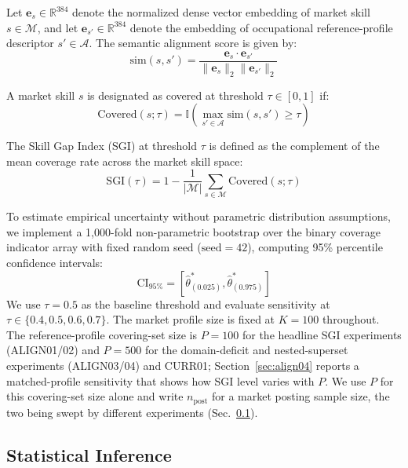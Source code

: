 \documentclass[journal]{IEEEtran}
\begin{document}
Let $\mathbf{e}_s \in \mathbb{R}^{384}$ denote the normalized dense vector embedding of market skill $s \in \mathcal{M}$, and let $\mathbf{e}_{s'} \in \mathbb{R}^{384}$ denote the embedding of occupational reference-profile descriptor $s' \in \mathcal{A}$. The semantic alignment score is given by:
\begin{equation}
\text{sim}(s, s') = \frac{\mathbf{e}_s \cdot \mathbf{e}_{s'}}{\|\mathbf{e}_s\|_2 \|\mathbf{e}_{s'}\|_2}
\label{eq:cosine}
\end{equation}

A market skill $s$ is designated as covered at threshold $\tau \in [0, 1]$ if:
\begin{equation}
\text{Covered}(s; \tau) = \mathbb{I}\left(\max_{s' \in \mathcal{A}} \text{sim}(s, s') \ge \tau\right)
\label{eq:covered}
\end{equation}

The Skill Gap Index (SGI) at threshold $\tau$ is defined as the complement of the mean coverage rate across the market skill space:
\begin{equation}
\text{SGI}(\tau) = 1 - \frac{1}{|\mathcal{M}|} \sum_{s \in \mathcal{M}} \text{Covered}(s; \tau)
\label{eq:sgi_tau}
\end{equation}

To estimate empirical uncertainty without parametric distribution assumptions, we implement a 1,000-fold non-parametric bootstrap over the binary coverage indicator array with fixed random seed ($\text{seed} = 42$), computing 95\% percentile confidence intervals:
\begin{equation}
\text{CI}_{95\%} = \left[\hat{\theta}^*_{(0.025)}, \hat{\theta}^*_{(0.975)}\right]
\label{eq:bootstrap}
\end{equation}
We use $\tau = 0.5$ as the baseline threshold and evaluate sensitivity at $\tau \in \{0.4, 0.5, 0.6, 0.7\}$. The market profile size is fixed at $K = 100$ throughout. The reference-profile covering-set size is $P = 100$ for the headline SGI experiments (ALIGN01/02) and $P = 500$ for the domain-deficit and nested-superset experiments (ALIGN03/04) and CURR01; Section~\ref{sec:align04} reports a matched-profile sensitivity that shows how SGI level varies with $P$. We use $P$ for this covering-set size alone and write $n_{\text{post}}$ for a market posting sample size, the two being swept by different experiments (Sec.~\ref{sec:statinf}).

\subsection{Statistical Inference}
\label{sec:statinf}
\end{document}
